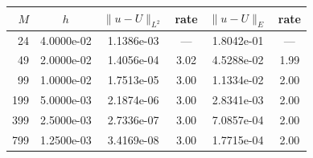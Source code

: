 \begin{tabular}{rccccc}
\toprule
$M$ & $h$ & $\|u-U\|_{L^2}$ & rate & $\|u-U\|_E$ & rate\\
\midrule
24 & 4.0000e-02 & 1.1386e-03 & --- & 1.8042e-01 & ---\\
49 & 2.0000e-02 & 1.4056e-04 & 3.02 & 4.5288e-02 & 1.99\\
99 & 1.0000e-02 & 1.7513e-05 & 3.00 & 1.1334e-02 & 2.00\\
199 & 5.0000e-03 & 2.1874e-06 & 3.00 & 2.8341e-03 & 2.00\\
399 & 2.5000e-03 & 2.7336e-07 & 3.00 & 7.0857e-04 & 2.00\\
799 & 1.2500e-03 & 3.4169e-08 & 3.00 & 1.7715e-04 & 2.00\\
\bottomrule
\end{tabular}
